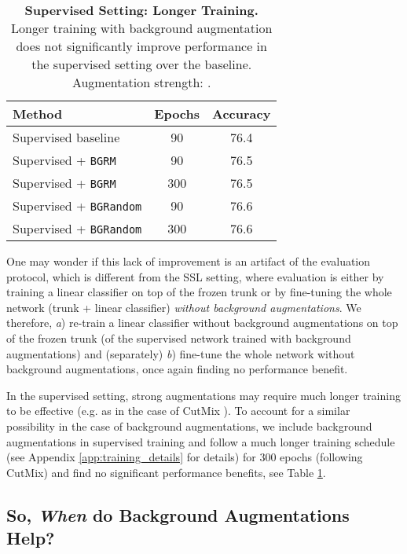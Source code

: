 \documentclass[twoside,11pt]{article}
\newcommand{\bgrm}{\texttt{BG\textunderscore RM}}
\newcommand{\bgrand}{\texttt{BG\textunderscore Random}}
\begin{document}
\begin{table}
    \centering
    \begin{tabular}{lcc}\toprule
    Method & Epochs & Accuracy \\\midrule
    Supervised baseline & 90 & 76.4 \\ \midrule
    Supervised + \bgrm & 90 & 76.5 \\
    \rowcolor{lightgray}
    Supervised + \bgrm & 300 & 76.5 \\
    Supervised + \bgrand & 90 & 76.6 \\
    \rowcolor{lightgray}
    Supervised + \bgrand & 300 & 76.6 \\ \bottomrule
    \end{tabular}
    \caption{\textbf{Supervised Setting: Longer Training.} Longer training with background augmentation does not significantly improve performance in the supervised setting over the baseline. Augmentation strength: .}
    \label{tab:supervised_longtrain}
\end{table}

One may wonder if this lack of improvement is an artifact of the evaluation protocol, which is  different from the SSL setting, where evaluation is either by training a linear classifier on top of the frozen trunk or by fine-tuning the whole network (trunk + linear classifier) \textit{without background augmentations}. We therefore, \textit{a}) re-train a linear classifier without background augmentations on top of the frozen trunk (of the supervised network trained with background augmentations) and (separately) \textit{b}) fine-tune the whole network without background augmentations, once again finding no performance benefit.


In the supervised setting, strong augmentations may require much longer training to be effective (e.g. as in the case of CutMix \citep{yun_cutmix_2019}). To account for a similar possibility in the case of background augmentations, we include background augmentations in supervised training and follow a much longer training schedule (see Appendix \ref{app:training_details} for details) for 300 epochs (following CutMix) and find no significant performance benefits, see Table \ref{tab:supervised_longtrain}.


\subsection{So, \textit{When} do Background Augmentations Help?}
\label{sec:rotnet}
\end{document}
